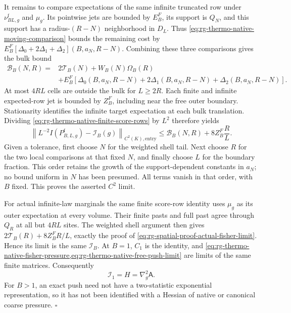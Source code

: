 It remains to compare expectations of the same infinite truncated row
under \(\nu^{\mathrm f}_{BL,g}\) and \(\mu_g\). Its pointwise jets are
bounded by \(E_B^F\), its support is \(Q_N\), and this support has a
radius-\((R-N)\) neighborhood in \(D_L\). Thus
\cref{eq:rg-thermo-native-moving-comparison} bounds the remaining cost by
\(E_B^F[\Delta_0+2\Delta_1+\Delta_2](B,a_N,R-N)\).
Combining these three comparisons gives the bulk bound
\begin{equation}
 \begin{split}
 \mathcal B_B(N,R)={}&2\mathcal T_B(N)+W_B(N)\Omega_B(R)\\
 &+E_B^F[\Delta_0(B,a_N,R-N)+2\Delta_1(B,a_N,R-N)
                                  +\Delta_2(B,a_N,R-N)].
 \end{split}
 \label{eq:rg-thermo-native-three-cutoff-bulk}
\end{equation}
At most \(4RL\) cells are outside the bulk for \(L\ge2R\). Each finite
and infinite expected-row jet is bounded by \(Z_B^F\), including near the
free outer boundary. Stationarity identifies the infinite target
expectation at each bulk translation. Dividing
\cref{eq:rg-thermo-native-finite-score-rows} by \(L^2\) therefore yields
\begin{equation}
 \left\|L^{-2}I(P^{\mathrm f}_{B,L,g})-\mathcal I_B(g)
                                      \right\|_{C^2(K),\mathrm{entry}}
 \le\mathcal B_B(N,R)+8Z_B^F\frac RL.
 \label{eq:rg-thermo-native-three-cutoff-bound}
\end{equation}
Given a tolerance, first choose \(N\) for the weighted shell tail. Next
choose \(R\) for the two local comparisons at that fixed \(N\), and
finally choose \(L\) for the boundary fraction. This order retains the
growth of the support-dependent constants in \(a_N\); no bound uniform
in \(N\) has been presumed. All terms vanish in that order, with \(B\)
fixed. This proves the asserted \(C^2\) limit.

For actual infinite-law marginals the same finite score-row identity uses
\(\mu_g\) as its outer expectation at every volume. Their finite pasts
and full past agree through \(Q_R\) at all but \(4RL\) sites. The weighted
shell argument then gives
\(2\mathcal T_B(R)+8Z_B^F R/L\), exactly the proof of
\cref{eq:rg-spatial-proof-actual-fisher-limit}. Hence its limit is the
same \(\mathcal I_B\). At \(B=1\), \(C_1\) is the identity, and
\cref{eq:rg-thermo-native-fisher-pressure,eq:rg-thermo-native-free-push-limit}
are limits of the same finite matrices. Consequently
\begin{equation}
 \mathcal I_1=H=\nabla_g^2\mathsf A.
 \label{eq:rg-thermo-native-identity-density}
\end{equation}
For \(B>1\), an exact push need not have a two-statistic exponential
representation, so it has not been identified with a Hessian of native
or canonical coarse pressure. \hfill\(\square\)


